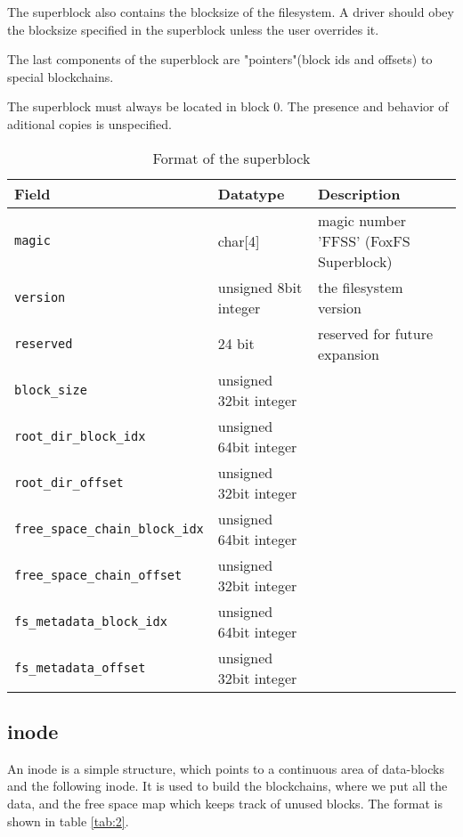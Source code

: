 \documentclass[a4paper,12pt]{article}
\begin{document}
			The superblock also contains the blocksize of the filesystem. A driver should obey the blocksize specified in the superblock unless the user overrides it.

			The last components of the superblock are "pointers"(block ids and offsets) to special blockchains.

			The superblock must always be located in block 0. The presence and behavior of aditional copies is unspecified.

			\begin{table}[ht]
				\caption{Format of the superblock}\label{tab:0}
				\begin{tabularx}{\linewidth}{|l|l|X|} \hline
					\textbf{Field} 					& \textbf{Datatype} 		& \textbf{Description} \\ \hline
					\verb|magic| 				& char[4] 	& magic number 'FFSS' (FoxFS Superblock) \\ \hline
					\verb|version| 				& unsigned 8bit integer 	& the filesystem version \\ \hline
					\verb|reserved| 	& 24 bit 	& reserved for future expansion \\ \hline
					\verb|block_size| 		& unsigned 32bit integer	&  \\ \hline
					\verb|root_dir_block_idx|					& unsigned 64bit integer					&  \\ \hline
					\verb|root_dir_offset|					& unsigned 32bit integer				&  \\ \hline
					\verb|free_space_chain_block_idx|					& unsigned 64bit integer					&  \\ \hline
					\verb|free_space_chain_offset|					& unsigned 32bit integer				&  \\ \hline
					\verb|fs_metadata_block_idx|					& unsigned 64bit integer					&  \\ \hline
					\verb|fs_metadata_offset|					& unsigned 32bit integer				&  \\ \hline

				\end{tabularx}
			\end{table}

 		\subsection{inode}
			An inode is a simple structure, which points to a continuous area of data-blocks and the following inode. It is used to build the blockchains, where we put all the data, and the free space map which keeps track of unused blocks. The format is shown in table \ref{tab:2}.
			
\end{document}
